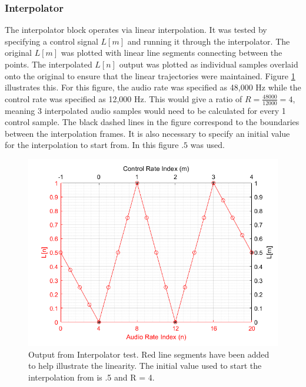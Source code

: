 \documentclass[../main.tex]{subfiles}
\begin{document}
\subsubsection{Interpolator}
The interpolator block operates via linear interpolation. It was tested by specifying a control signal $L[m]$ and running it through the interpolator. The original $L[m]$ was plotted with linear line segments connecting between the points. The interpolated $L[n]$ output was plotted as individual samples overlaid onto the original to ensure that the linear trajectories were maintained. Figure \ref{fig:InterpTest} illustrates this. For this figure, the audio rate was specified as 48,000 Hz while the control rate was specified as 12,000 Hz. This would give a ratio of $R = \frac{48000}{12000} = 4$, meaning 3 interpolated audio samples would need to be calculated for every 1 control sample. The black dashed lines in the figure correspond to the boundaries between the interpolation frames. It is also necessary to specify an initial value for the interpolation to start from. In this figure $.5$ was used.

\begin{figure}[h]
    \centering
    \includegraphics[scale=.65]{./images/plots/InterpolatorTest.png}
    \caption{Output from Interpolator test. Red line segments have been added to help illustrate the linearity. The initial value used to start the interpolation from is .5 and R = 4.}
    \label{fig:InterpTest}
\end{figure}
\end{document}
